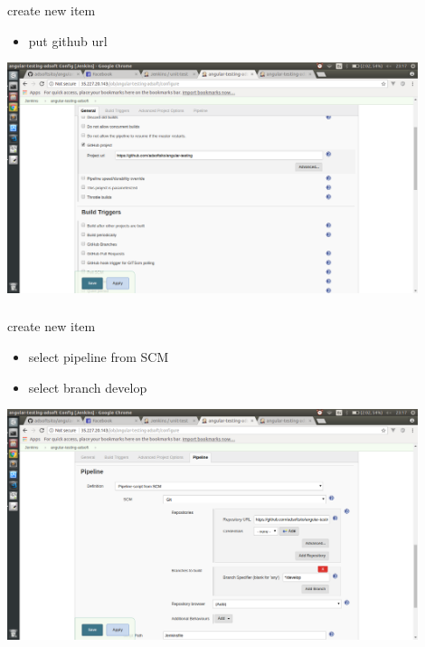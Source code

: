\documentclass{beamer}
\begin{document}
\begin{frame}\frametitle{} 

\begin{block}{create new item}
\begin{itemize}
\item put github url
\end{itemize}
\end{block}


\begin{center}
\includegraphics[width=0.9\textwidth]{jenkins-github.png}
\end{center}

\end{frame}



\begin{frame}\frametitle{} 

\begin{block}{create new item}
\begin{itemize}
\item select pipeline from SCM
\item select branch develop
\end{itemize}
\end{block}


\begin{center}
\includegraphics[width=0.9\textwidth]{jenkins-pipeline.png}
\end{center}

\end{frame}
\end{document}

